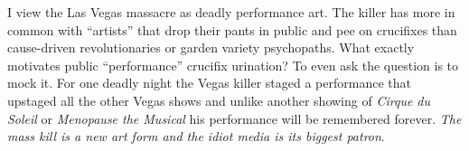 I view the Las Vegas massacre as deadly performance art. The killer has
more in common with ``artists'' that drop their pants in public and pee
on crucifixes than cause-driven revolutionaries or garden variety
psychopaths. What exactly motivates public ``performance'' crucifix
urination? To even ask the question is to mock it. For one deadly night
the Vegas killer staged a performance that upstaged all the other Vegas
shows and unlike another showing of \emph{Cirque du Soleil} or
\emph{Menopause the Musical} his performance will be remembered forever.
\emph{The mass kill is a new art form and the idiot media is its biggest
patron}.



%
 
